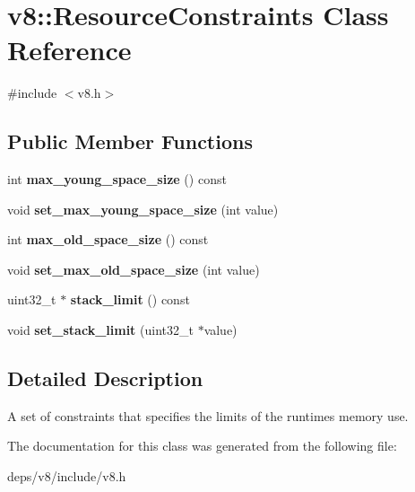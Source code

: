 \hypertarget{classv8_1_1_resource_constraints}{}\section{v8\+:\+:Resource\+Constraints Class Reference}
\label{classv8_1_1_resource_constraints}


{\ttfamily \#include $<$v8.\+h$>$}

\subsection*{Public Member Functions}
\begin{DoxyCompactItemize}
\item 
\hypertarget{classv8_1_1_resource_constraints_a0029d59f46980f02651792eac83bd432}{}int {\bfseries max\+\_\+young\+\_\+space\+\_\+size} () const \label{classv8_1_1_resource_constraints_a0029d59f46980f02651792eac83bd432}

\item 
\hypertarget{classv8_1_1_resource_constraints_abe82f0ef2376266257d3a94b9d4af265}{}void {\bfseries set\+\_\+max\+\_\+young\+\_\+space\+\_\+size} (int value)\label{classv8_1_1_resource_constraints_abe82f0ef2376266257d3a94b9d4af265}

\item 
\hypertarget{classv8_1_1_resource_constraints_a72840efdbcfc7bb287c6aea38d0b07b9}{}int {\bfseries max\+\_\+old\+\_\+space\+\_\+size} () const \label{classv8_1_1_resource_constraints_a72840efdbcfc7bb287c6aea38d0b07b9}

\item 
\hypertarget{classv8_1_1_resource_constraints_aa764be7c76b4baa3fce7a54c3777b5e9}{}void {\bfseries set\+\_\+max\+\_\+old\+\_\+space\+\_\+size} (int value)\label{classv8_1_1_resource_constraints_aa764be7c76b4baa3fce7a54c3777b5e9}

\item 
\hypertarget{classv8_1_1_resource_constraints_aafc4a94f2eeb0684e7a50f355eb4d06d}{}uint32\+\_\+t $\ast$ {\bfseries stack\+\_\+limit} () const \label{classv8_1_1_resource_constraints_aafc4a94f2eeb0684e7a50f355eb4d06d}

\item 
\hypertarget{classv8_1_1_resource_constraints_a26ed3e89985a4afe34e84509fb093cf1}{}void {\bfseries set\+\_\+stack\+\_\+limit} (uint32\+\_\+t $\ast$value)\label{classv8_1_1_resource_constraints_a26ed3e89985a4afe34e84509fb093cf1}

\end{DoxyCompactItemize}


\subsection{Detailed Description}
A set of constraints that specifies the limits of the runtime\textquotesingle{}s memory use. 

The documentation for this class was generated from the following file\+:\begin{DoxyCompactItemize}
\item 
deps/v8/include/v8.\+h\end{DoxyCompactItemize}
